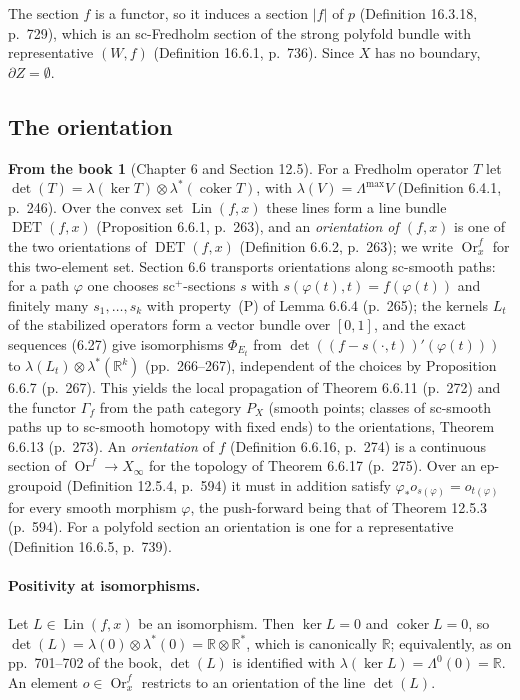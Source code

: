 \documentclass[11pt,a4paper]{article}
\theoremstyle{plain}
\theoremstyle{definition}
\newtheorem{recall}[theorem]{From the book}
\theoremstyle{remark}
\newcommand{\R}{\mathbb{R}}
\newcommand{\abs}[1]{\lvert #1\rvert}
\newcommand{\Lin}{\operatorname{Lin}}
\newcommand{\DET}{\operatorname{DET}}
\newcommand{\Or}{\operatorname{Or}}
\newcommand{\coker}{\operatorname{coker}}
\begin{document}
The section $f$ is a functor, so it induces a section $\abs f$ of $p$ (Definition 16.3.18, p.~729),
which is an sc-Fredholm section of the strong polyfold bundle with representative $(W,f)$
(Definition 16.6.1, p.~736). Since $X$ has no boundary, $\partial Z=\emptyset$.

\subsection{The orientation}\label{sec:orientation}

\begin{recall}[Chapter 6 and Section 12.5]\label{rec:orientation}
For a Fredholm operator $T$ let $\det(T)=\lambda(\ker T)\otimes\lambda^*(\coker T)$, with
$\lambda(V)=\Lambda^{\max}V$ (Definition 6.4.1, p.~246). Over the convex set $\Lin(f,x)$ these lines form
a line bundle $\DET(f,x)$ (Proposition 6.6.1, p.~263), and an \emph{orientation of $(f,x)$} is one of
the two orientations of $\DET(f,x)$ (Definition 6.6.2, p.~263); we write $\Or^f_x$ for this two-element
set. Section 6.6 transports orientations along sc-smooth paths: for a path $\varphi$ one chooses
sc$^+$-sections $s$ with $s(\varphi(t),t)=f(\varphi(t))$ and finitely many $s_1,\dots,s_k$ with
property~(P) of Lemma 6.6.4 (p.~265); the kernels $L_t$ of the stabilized operators form a vector
bundle over $[0,1]$, and the exact sequences (6.27) give isomorphisms $\Phi_{E_t}$ from
$\det((f-s(\cdot,t))'(\varphi(t)))$ to $\lambda(L_t)\otimes\lambda^*(\R^k)$ (pp.~266--267), independent
of the choices by Proposition 6.6.7 (p.~267). This yields the local propagation of
Theorem 6.6.11 (p.~272) and the functor $\Gamma_f$ from the path category $P_X$ (smooth points;
classes of sc-smooth paths up to sc-smooth homotopy with fixed ends) to the orientations,
Theorem 6.6.13 (p.~273). An \emph{orientation} of $f$ (Definition 6.6.16, p.~274) is a continuous
section of $\Or^f\to X_\infty$ for the topology of Theorem 6.6.17 (p.~275). Over an ep-groupoid
(Definition 12.5.4, p.~594) it must in addition satisfy $\varphi_*o_{s(\varphi)}=o_{t(\varphi)}$ for
every smooth morphism $\varphi$, the push-forward being that of Theorem 12.5.3 (p.~594). For a
polyfold section an orientation is one for a representative (Definition 16.6.5, p.~739).
\end{recall}

\paragraph{Positivity at isomorphisms.}
Let $L\in\Lin(f,x)$ be an isomorphism. Then $\ker L=0$ and $\coker L=0$, so
$\det(L)=\lambda(0)\otimes\lambda^*(0)=\R\otimes\R^*$, which is canonically $\R$; equivalently, as on
pp.~701--702 of the book, $\det(L)$ is identified with $\lambda(\ker L)=\Lambda^0(0)=\R$. An element
$o\in\Or^f_x$ restricts to an orientation of the line $\det(L)$.
\end{document}
